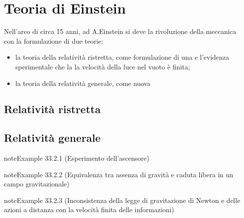 \documentclass[letterpaper,10pt,italian]{jupyterBook}
\begin{document}
\sphinxstepscope


\chapter{Teoria di Einstein}
\label{\detokenize{ch/modern/einstein:teoria-di-einstein}}\label{\detokenize{ch/modern/einstein:physics-hs-modern-einstein}}\label{\detokenize{ch/modern/einstein::doc}}
\sphinxAtStartPar
Nell’arco di circa 15 anni, ad A.Einstein si deve la rivoluzione della meccanica con la formulazione di due teorie:
\begin{itemize}
\item {} 
\sphinxAtStartPar
la teoria della relatività ristretta, come formulazione di una  e l’evidenza sperimentale che la la velocità della luce nel vuoto è finita;

\item {} 
\sphinxAtStartPar
la teoria della relatività generale, come nuova 

\end{itemize}


\section{Relatività ristretta}
\label{\detokenize{ch/modern/einstein:relativita-ristretta}}\label{\detokenize{ch/modern/einstein:physics-hs-modern-einstein-special}}

\section{Relatività generale}
\label{\detokenize{ch/modern/einstein:relativita-generale}}\label{\detokenize{ch/modern/einstein:physics-hs-modern-einstein-general}}\label{ch/modern/einstein:example-0}
\begin{sphinxadmonition}{note}{Example 33.2.1 (Esperimento dell’ascensore)}


\end{sphinxadmonition}
\label{ch/modern/einstein:example-1}
\begin{sphinxadmonition}{note}{Example 33.2.2 (Equivalenza tra assenza di gravità e caduta libera in un campo gravitazionale)}


\end{sphinxadmonition}
\label{ch/modern/einstein:example-2}
\begin{sphinxadmonition}{note}{Example 33.2.3 (Inconsistenza della legge di gravitazione di Newton e delle azioni a distanza con la velocità finita delle informazioni)}


\end{sphinxadmonition}
\end{document}
